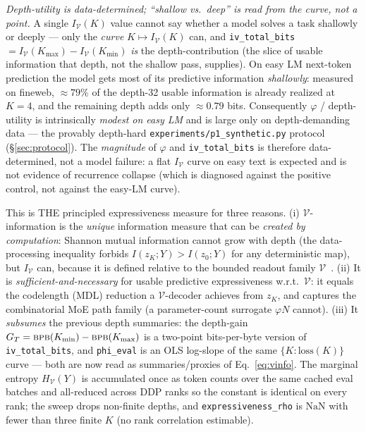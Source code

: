 \documentclass[11pt]{article}
\newcommand{\bpb}{\textsc{bpb}}
\newcommand{\code}[1]{\texttt{#1}}
\begin{document}
\emph{Depth-utility is data-determined; ``shallow vs.\ deep'' is read from the curve, not a point.}
A single \(I_{\mathcal V}(K)\) value cannot say whether a model solves a task shallowly or deeply --- only
the \emph{curve} \(K\mapsto I_{\mathcal V}(K)\) can, and \code{iv\_total\_bits}
\(=I_{\mathcal V}(K_{\max})-I_{\mathcal V}(K_{\min})\) \emph{is} the depth-contribution (the slice of usable
information that depth, not the shallow pass, supplies).  On easy LM next-token prediction the model gets
most of its predictive information \emph{shallowly}: measured on fineweb, \(\approx79\%\) of the depth-32
usable information is already realized at \(K{=}4\), and the remaining depth adds only \(\approx0.79\)
bits.  Consequently \(\varphi\) / depth-utility is intrinsically \emph{modest on easy LM} and is large only
on depth-demanding data --- the provably depth-hard \code{experiments/p1\_synthetic.py} protocol
(\S\ref{sec:protocol}).  The \emph{magnitude} of \(\varphi\) and \code{iv\_total\_bits} is
therefore data-determined, not a model failure: a flat \(I_{\mathcal V}\) curve on easy text is expected and
is not evidence of recurrence collapse (which is diagnosed against the positive control, not against the
easy-LM curve).

This is THE principled expressiveness measure for three reasons.  (i) \(\mathcal{V}\)-information is
the \emph{unique} information measure that can be \emph{created by computation}: Shannon mutual
information cannot grow with depth (the data-processing inequality forbids
\(I(z_K;Y)>I(z_0;Y)\) for any deterministic map), but \(I_{\mathcal{V}}\) can, because it is defined
relative to the bounded readout family \(\mathcal{V}\)~\cite{vinfo}.  (ii) It is
\emph{sufficient-and-necessary} for usable predictive expressiveness w.r.t.\ \(\mathcal{V}\): it equals
the codelength (MDL) reduction a \(\mathcal{V}\)-decoder achieves from \(z_K\), and captures the
combinatorial MoE path family (a parameter-count surrogate \(\varphi N\) cannot).  (iii) It
\emph{subsumes} the previous depth summaries: the depth-gain \(G_T=\bpb(K_{\min})-\bpb(K_{\max})\) is a
two-point bits-per-byte version of \code{iv\_total\_bits}, and \code{phi\_eval} is an OLS log-slope of
the same \(\{K:\mathrm{loss}(K)\}\) curve --- both are now read as summaries/proxies of
Eq.~\eqref{eq:vinfo}.  The marginal entropy \(H_{\mathcal{V}}(Y)\) is accumulated once as token counts
over the same cached eval batches and all-reduced across DDP ranks so the constant is identical on
every rank; the sweep drops non-finite depths, and \code{expressiveness\_rho} is \(\mathrm{NaN}\) with
fewer than three finite \(K\) (no rank correlation estimable).
\end{document}
